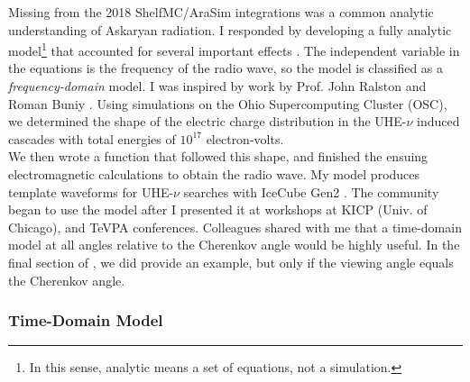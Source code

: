 \documentclass[../../../main.tex]{subfiles}
\begin{document}
Missing from the 2018 ShelfMC/AraSim integrations was a common analytic understanding of Askaryan radiation.  I responded by developing a fully analytic model\footnote{In this sense, analytic means a set of equations, not a simulation.} that accounted for several important effects \cite{10.1016/j.astropartphys.2017.03.008}.  The independent variable in the equations is the frequency of the radio wave, so the model is classified as a \textit{frequency-domain} model.  I was inspired by work by Prof. John Ralston and Roman Buniy \cite{10.1103/physrevd.65.016003}.  Using simulations on the Ohio Supercomputing Cluster (OSC), we determined the shape of the electric charge distribution in the UHE-$\nu$ induced cascades with total energies of $10^{17}$ electron-volts.
\\
\vspace{0.25cm}
We then wrote a function that followed this shape, and finished the ensuing electromagnetic calculations to obtain the radio wave.  My model produces template waveforms for UHE-$\nu$ searches with IceCube Gen2 \cite{10.1016/j.astropartphys.2017.03.008}.  The community began to use the model after I presented it at workshops at KICP (Univ. of Chicago), and TeVPA conferences.  Colleagues shared with me that a time-domain model at all angles relative to the Cherenkov angle would be highly useful.  In the final section of \cite{10.1016/j.astropartphys.2017.03.008}, we did provide an example, but only if the viewing angle equals the Cherenkov angle.

\subsubsection{Time-Domain Model}
\end{document}
